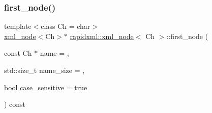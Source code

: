 \subsubsection{\texorpdfstring{first\_node()}{first\_node()}}
{\footnotesize\ttfamily template$<$class Ch = char$>$ \\
\mbox{\hyperlink{classrapidxml_1_1xml__node}{xml\+\_\+node}}$<$Ch$>$$\ast$ \mbox{\hyperlink{classrapidxml_1_1xml__node}{rapidxml\+::xml\+\_\+node}}$<$ Ch $>$\+::first\+\_\+node (\begin{DoxyParamCaption}\item[{const Ch $\ast$}]{name = {},  }\item[{std\+::size\+\_\+t}]{name\+\_\+size = {},  }\item[{bool}]{case\+\_\+sensitive = {\ttfamily true} }\end{DoxyParamCaption}) const\hspace{0.3cm}{\ttfamily [inline]}}

